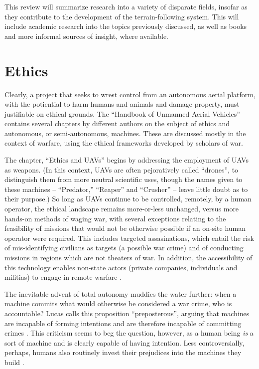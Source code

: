 \documentclass[10pt]{article}
\begin{document}
This review will summarize research into a variety of disparate fields, insofar as they contribute to the development of the terrain-following system. This will include academic research into the topics previously discussed, as well as books and more informal sources of insight, where available.


\section{Ethics}

Clearly, a project that seeks to wrest control from an autonomous aerial platform, with the potiential to harm humans and animals and damage property, must justifiable on ethical grounds. The ``Handbook of Unmanned Aerial Vehicles'' \cite{Valavanis2015j} contains several chapters by different authors on the subject of ethics and autonomous, or semi-autonomous, machines. These are discussed mostly in the context of warfare, using the ethical frameworks developed by scholars of war.

The chapter, ``Ethics and UAVs'' \cite{Valavanis2015bz} begins by addressing the employment of UAVs as weapons. (In this context, UAVs are often pejoratively called ``drones'', to distinguish them from more neutral scientific uses, though the names given to these machines -- ``Predator,'' ``Reaper'' and ``Crusher'' \cite{Lucas2011} -- leave little doubt as to their purpose.) So long as UAVs continue to be controlled, remotely, by a human operator, the ethical landscape remains more-or-less unchanged, versus more hands-on methods of waging war, with several exceptions relating to the feasibility of missions that would not be otherwise possible if an on-site human operator were required. This includes targeted assasinations, which entail the risk of mis-identifying civilians as targets (a possible war crime) and of conducting missions in regions which are not theaters of war. In addition, the accessibility of this technology enables non-state actors (private companies, individuals and militias) to engage in remote warfare \cite[p.2867]{Valavanis2015bz}. 

The inevitable advent of total autonomy muddies the water further: when a machine commits what would otherwise be considered a war crime, who is accountable? Lucas calls this proposition ``preposterous'', arguing that machines are incapable of forming intentions and are therefore incapable of committing crimes \cite[p.2868]{Valavanis2015bz}. This criticism seems to beg the question, however, as a human being \emph{is} a sort of machine and is clearly capable of having intention. Less controversially, perhaps, humans also routinely invest their prejudices into the machines they build \cite{Greenwald1998,Caliskan2017}. 
\end{document}
